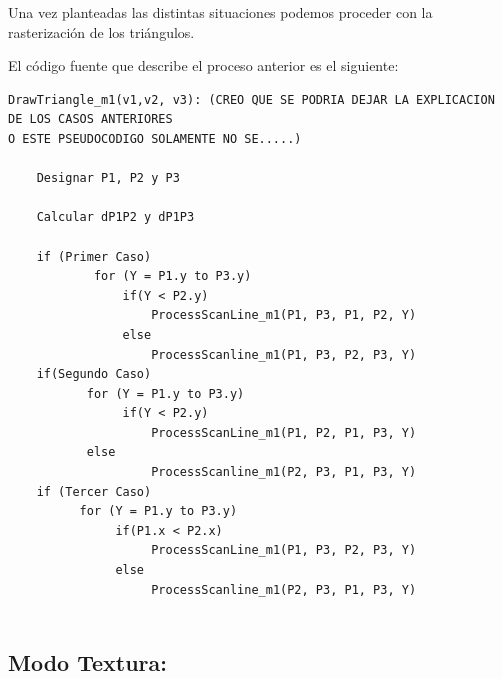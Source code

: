 \documentclass[a4paper]{article}
\begin{document}
Una vez planteadas las distintas situaciones podemos proceder con la rasterización de los triángulos. 
  
El código fuente que describe el proceso anterior es el siguiente:

\begin{verbatim}
DrawTriangle_m1(v1,v2, v3): (CREO QUE SE PODRIA DEJAR LA EXPLICACION DE LOS CASOS ANTERIORES 
O ESTE PSEUDOCODIGO SOLAMENTE NO SE.....)

    Designar P1, P2 y P3 
    
    Calcular dP1P2 y dP1P3
    
    if (Primer Caso)
            for (Y = P1.y to P3.y)    	
                if(Y < P2.y)
                    ProcessScanLine_m1(P1, P3, P1, P2, Y)
                else
                    ProcessScanline_m1(P1, P3, P2, P3, Y)
    if(Segundo Caso)
           for (Y = P1.y to P3.y)    	
                if(Y < P2.y)
                    ProcessScanLine_m1(P1, P2, P1, P3, Y)
           else
                    ProcessScanline_m1(P2, P3, P1, P3, Y)
    if (Tercer Caso)	
          for (Y = P1.y to P3.y)    	
               if(P1.x < P2.x)
                    ProcessScanLine_m1(P1, P3, P2, P3, Y)
               else
                    ProcessScanline_m1(P2, P3, P1, P3, Y)
  					
\end{verbatim}


\subsection{Modo Textura:} 
\end{document}
